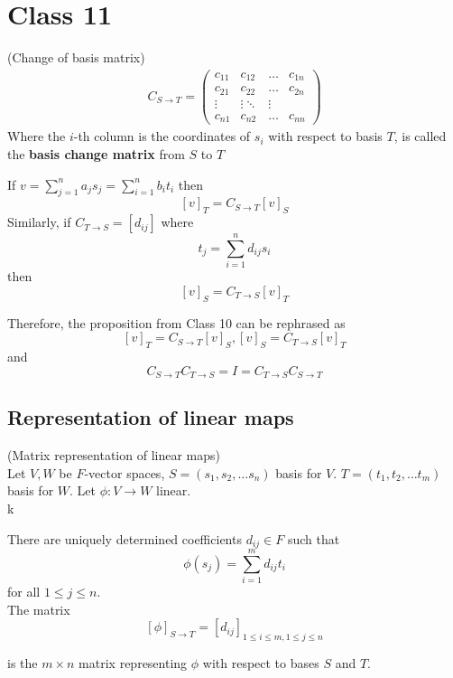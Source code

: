 \section{Class 11}

\begin{definition}
    (Change of basis matrix)
    \begin{align*}
        C_{S \to T} = \begin{pmatrix} 
        c_{11}  & c_{12} & \hdots & c_{1n} \\
        c_{21}  & c_{22} & \hdots & c_{2n} \\
        \vdots & \vdots \ddots & \vdots \\
        c_{n1} & c_{n2} & \hdots & c_{nn}
        \end{pmatrix}
    \end{align*} 
    Where the $i$-th column is the coordinates of $s_i$ with respect to basis $T$, is called the \textbf{basis change matrix} from $S$ to $T$
\end{definition}

\begin{remark}
    If $v= \sum\limits_{ j = 1}^{n} a_j s_j = \sum\limits_{i = 1}^{n}  b_i t_i$ then 
    \[
        [v]_T = C_{S \to T} [v]_S
    \]
    Similarly, if $C_{T \to S} = [d_{ij}]$  where 
    \[
        t_j = \sum\limits_{i = 1}^{n} d_{ij}s_i
    \]
    then 
    \[
        [v]_S = C_{T \to S} [v]_T
    \]

    Therefore, the proposition from Class 10 can be rephrased as 
    \[
        [v]_T = C_{S \to T} [v]_S, [v]_S = C_{ T \to S} [v]_T
    \]
    and 
    \[
        C_{S \to T} C_{T \to S} = I = C_{T \to S} C_{S \to T}
    \]
\end{remark}

\subsection{Representation of linear maps}

\begin{definition} 
    (Matrix representation of linear maps) \\

    Let $V, W$ be $F$-vector spaces, $S = (s_1, s_2, \hdots s_n)$ basis for $V$. $T = (t_1, t_2, \hdots t_m)$ basis for $W$. Let $\phi:V \to W$ linear. \\k

    There are uniquely determined coefficients $d_{ij} \in F$ such that 
    \[
        \phi(s_j ) = \sum\limits_{i = 1}^{m} d_{ij } t_i
    \]
    for all $1 \leq j \leq n$. \\

    The matrix 
    \[
        [\phi]_{S \to T} = [d_{ij}]_{1 \leq i \leq m, 1 \leq j \leq n}
    \]

    is the $m \times n$ matrix representing $\phi$ with respect to bases $S$ and $T$.
\end{definition}

